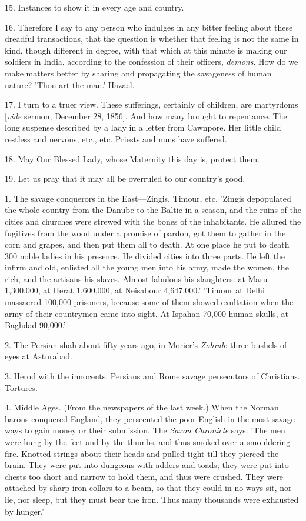 15. Instances to show it in every age and
country.

16. Therefore I say to any person who indulges in
any bitter feeling about these dreadful transactions, that the
question is whether that feeling is not the same in kind, though
different in degree, with that which at this minute is making our
soldiers in India, according to the confession of their officers, \emph{demons}.
How do we make matters better by sharing and propagating the
savageness of human nature? 'Thou art the man.' Hazael.

17. I turn to a truer view. These sufferings,
certainly of children, are martyrdoms [\emph{vide} sermon, December
28, 1856]. And how many brought to repentance. The long suspense
described by a lady in a letter from Cawnpore. Her little child
restless and nervous, etc., etc. Priests and nuns have suffered.

18. May Our Blessed Lady, whose Maternity this
day is, protect them.

19. Let us pray that it may all be overruled to
our country's good.


1. The savage conquerors in the East—Zingis,
Timour, etc. 'Zingis depopulated the whole country from the Danube to
the Baltic in a season, and the ruins of the cities and churches were
strewed with the bones of the inhabitants. He allured the fugitives
from the wood under a promise of pardon, got them to gather in the
corn and grapes, and then put them all to death. At one place he put
to death 300 noble ladies in his presence. He divided cities into
three parts. He left the infirm and old, enlisted all the young
men into his army, made the women, the rich, and the artisans his
slaves. Almost fabulous his slaughters: at Maru 1,300,000, at Herat
1,600,000, at Neisabour 4,647,000.' 'Timour at Delhi massacred 100,000
prisoners, because some of them showed exultation when the army of
their countrymen came into sight. At Ispahan 70,000 human skulls, at
Baghdad 90,000.'

2. The Persian shah about fifty years ago, in
Morier's \emph{Zohrab}: three bushels of eyes at Asturabad.

3. Herod with the innocents. Persians and Rome
savage persecutors of Christians. Tortures.

4. Middle Ages. (From the newspapers of the last
week.) When the Norman barons conquered England, they persecuted the
poor English in the most savage ways to gain money or their
submission. The \emph{Saxon Chronicle} says: 'The men were hung by the
feet and by the thumbs, and thus smoked over a smouldering fire.
Knotted strings about their heads and pulled tight till they pierced
the brain. They were put into dungeons with adders and toads; they
were put into chests too short and narrow to hold them, and thus were
crushed. They were attached by sharp iron collars to a beam, so that
they could in no ways sit, nor lie, nor sleep, but they must bear the
iron. Thus many thousands were exhausted by hunger.'

